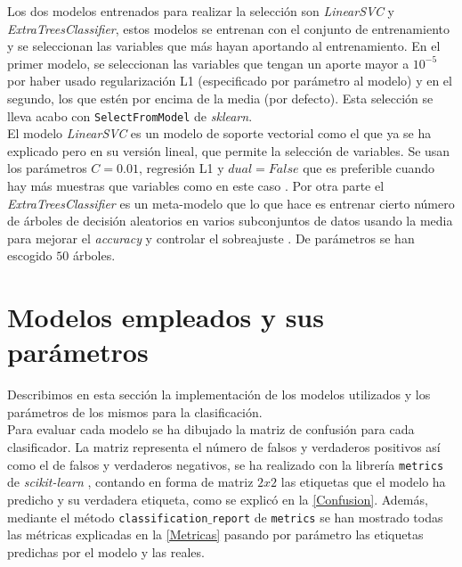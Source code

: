 Los dos modelos entrenados para realizar la selección son \textit{LinearSVC} y \textit{ExtraTreesClassifier}, estos modelos se entrenan con el conjunto de entrenamiento y se seleccionan las variables que más hayan aportando al entrenamiento. En el primer modelo, se seleccionan las variables que tengan un aporte mayor a $10^{-5}$ por haber usado regularización L1 (especificado por parámetro al modelo) y en el segundo, los que estén por encima de la media (por defecto). Esta selección se lleva acabo con \texttt{SelectFromModel} de \textit{sklearn}.\\
El modelo \textit{LinearSVC} es un modelo de soporte vectorial como el que ya se ha explicado pero en su versión lineal, que permite la selección de variables. Se usan los parámetros $C=0.01$, regresión L1 y $dual=False$ que es preferible cuando hay más muestras que variables como en este caso \cite{scikit-learn}. Por otra parte el \textit{ExtraTreesClassifier} es un meta-modelo que lo que hace es entrenar cierto número de árboles de decisión aleatorios en varios subconjuntos de datos usando la media para mejorar el \textit{accuracy} y controlar el sobreajuste \cite{scikit-learn}. De parámetros se han escogido $50$ árboles.

\section{Modelos empleados y sus parámetros}
Describimos en esta sección la implementación de los modelos utilizados y los parámetros de los mismos para la clasificación.\\
Para evaluar cada modelo se ha dibujado \cite{Hunter:2007} la matriz de confusión para cada clasificador. La matriz representa el número de falsos y verdaderos positivos así como el de falsos y verdaderos negativos, se ha realizado con la librería \texttt{metrics} de \textit{scikit-learn} \cite{scikit2021metrics}, contando en forma de matriz $2x2$ las etiquetas que el modelo ha predicho y su verdadera etiqueta, como se explicó en la \autoref{Confusion}. Además, mediante el método \texttt{classification$\_$report} de \texttt{metrics} se han mostrado todas las métricas explicadas en la \autoref{Metricas} pasando por parámetro las etiquetas predichas por el modelo y las reales.
